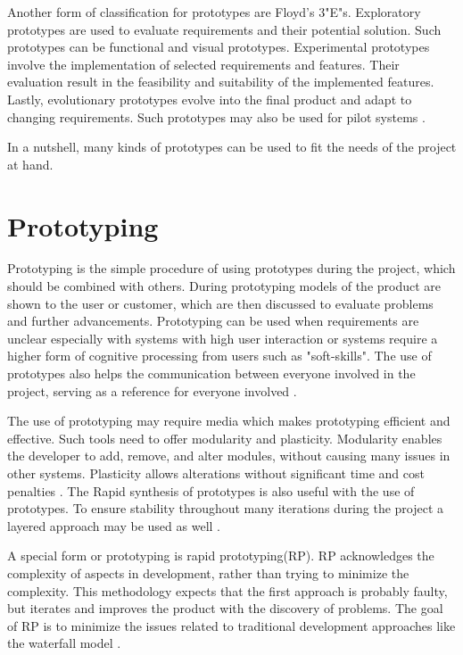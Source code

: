 \documentclass[runningheads]{llncs}
\begin{document}
Another form of classification for prototypes are Floyd's 3"E"s.
Exploratory prototypes are used to evaluate requirements and their potential solution. Such prototypes can be functional and 
visual prototypes.
Experimental prototypes involve the implementation of selected requirements and features. Their evaluation result in the feasibility
and suitability of the implemented features.
Lastly, evolutionary prototypes evolve into the final product and adapt to changing requirements. Such prototypes may also be used for
pilot systems \cite{ref_ui}.

In a nutshell, many kinds of prototypes can be used to fit the needs of the project at hand.

\section{Prototyping}
Prototyping is the simple procedure of using prototypes during the project, which should be combined with others\cite{ref_prac}. 
During prototyping models of the product are shown to the user or customer, which are then discussed to evaluate problems 
and further advancements. Prototyping can be used when requirements are unclear especially with systems with high user interaction 
or systems require a higher form of cognitive processing from users such as "soft-skills".
The use of prototypes also helps the communication between everyone involved in the project, serving as a reference for everyone 
involved \cite{ref_RPInAction}.

The use of prototyping may require media which makes prototyping efficient and effective. Such tools need to offer modularity and plasticity.
Modularity enables the developer to add, remove, and alter modules, without causing many issues in other systems. Plasticity allows alterations
without significant time and cost penalties \cite{ref_RPalternativeStrategy}. The Rapid synthesis of prototypes is also useful with the use of 
prototypes\cite{ref_RPalternativeStrategy}. To ensure stability throughout many iterations during the project a layered approach may be 
used as well \cite{ref_health}.

A special form or prototyping is rapid prototyping(RP). RP acknowledges the complexity of aspects in development, rather than trying to minimize 
the complexity. This methodology expects that the first approach is probably faulty, but iterates and improves the product with the discovery of
problems. The goal of RP is to minimize the issues related to traditional development approaches like the waterfall model \cite{ref_RPalternativeStrategy}.
\end{document}
